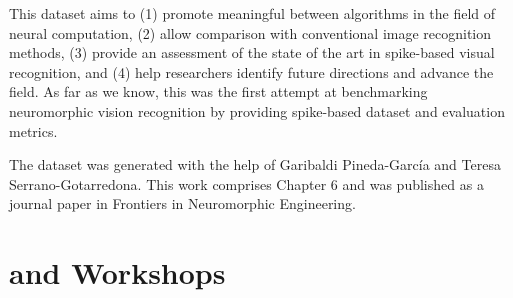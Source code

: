 \begin{itemize}
	This dataset aims to (1) promote meaningful \DIFdelbegin {}\DIFdelend \DIFaddbegin {}\DIFaddend between algorithms in the field of neural computation, (2) allow comparison with conventional image recognition methods, (3) provide an assessment of the state of the art in spike-based visual recognition, and (4) help researchers identify future directions and advance the field.
	As far as we know, this was the first attempt at benchmarking neuromorphic vision recognition by providing \DIFdelbegin {}\DIFdelend \DIFaddbegin {}\DIFaddend spike-based dataset and evaluation metrics.

	The dataset was generated with the help of Garibaldi Pineda-Garc\'ia and Teresa Serrano-Gotarredona.
	This work comprises Chapter 6 and was published as a journal paper in Frontiers in Neuromorphic Engineering.
\end{itemize}

   
\section{\DIFdelbegin {}\DIFdelend \DIFaddbegin {}\DIFaddend and Workshops}
\DIFaddbegin 

